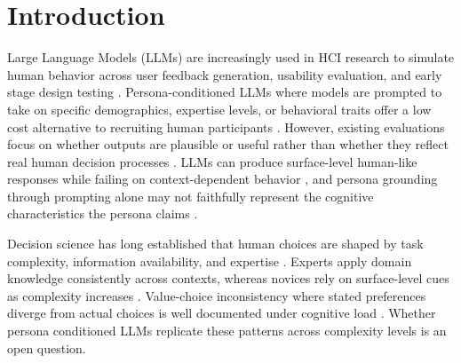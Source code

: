 \documentclass[manuscript,review]{acmart}
\begin{document}


\maketitle

\section{Introduction}
Large Language Models (LLMs) are increasingly used in HCI research to simulate human behavior across user feedback generation, usability evaluation, and early stage design testing \cite{hamalainen2023synthetichci, park2023generativeagents}. Persona-conditioned LLMs where models are prompted to take on specific demographics, expertise levels, or behavioral traits offer a low cost alternative to recruiting human participants \cite{argyle2023out, aher2023usinglargelanguagemodels}. However, existing evaluations focus on whether outputs are plausible or useful rather than whether they reflect real human decision processes \cite{hamalainen2023synthetichci, salminen2025syntheticusers}. LLMs can produce surface-level human-like responses while failing on context-dependent behavior \cite{santurkar}, and persona grounding through prompting alone may not faithfully represent the cognitive characteristics the persona claims \cite{aher2023usinglargelanguagemodels, shanahans}.

Decision science has long established that human choices are shaped by task complexity, information availability, and expertise \cite{payne1993adaptive}. Experts apply domain knowledge consistently across contexts, whereas novices rely on surface-level cues as complexity increases \cite{payne1993adaptive}. Value-choice inconsistency where stated preferences diverge from actual choices is well documented under cognitive load \cite{Tversky, sweller1988cognitive}. Whether persona conditioned LLMs replicate these patterns across complexity levels is an open question.
\end{document}
